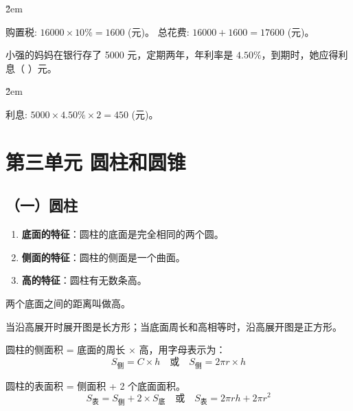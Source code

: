 \v{2em}

\begin{solution}
    购置税: $16000 \times 10\% = 1600$ (元)。
    总花费: $16000 + 1600 = 17600$ (元)。
\end{solution}

\begin{example}
    小强的妈妈在银行存了 5000 元，定期两年，年利率是 $4.50\%$，到期时，她应得利息（ \quad ）元。
\end{example}

\v{2em}

\begin{solution}
    利息: $5000 \times 4.50\% \times 2 = 450$ (元)。
\end{solution}


\section*{第三单元 圆柱和圆锥}

\subsection*{（一）圆柱}
\begin{definition}[圆柱的特征]
    \begin{enumerate}
        \item \textbf{底面的特征}：圆柱的底面是完全相同的两个圆。
        \item \textbf{侧面的特征}：圆柱的侧面是一个曲面。
        \item \textbf{高的特征}：圆柱有无数条高。
    \end{enumerate}
\end{definition}

\begin{definition}[圆柱的高]
    两个底面之间的距离叫做高。
\end{definition}

\begin{definition}[圆柱的侧面展开图]
    当沿高展开时展开图是长方形；当底面周长和高相等时，沿高展开图是正方形。
\end{definition}

\begin{theorem}[圆柱的侧面积]
    圆柱的侧面积 = 底面的周长 $\times$ 高，用字母表示为：
    $$ S_{侧} = C \times h \quad \text{或} \quad S_{侧} = 2\pi r \times h $$
\end{theorem}

\begin{theorem}[圆柱的表面积]
    圆柱的表面积 = 侧面积 + 2 个底面面积。
    $$ S_{表} = S_{侧} + 2 \times S_{底} \quad \text{或} \quad S_{表} = 2\pi r h + 2\pi r^2 $$
\end{theorem}

